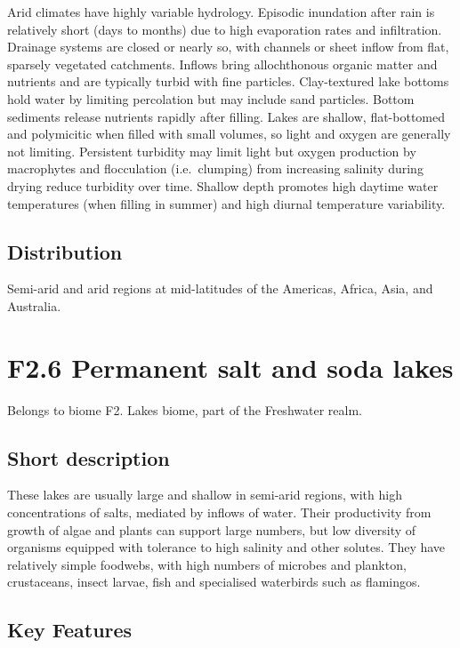 \documentclass[
  letterpaper,
  DIV=11,
  numbers=noendperiod]{scrartcl}
\begin{document}
Arid climates have highly variable hydrology. Episodic inundation after
rain is relatively short (days to months) due to high evaporation rates
and infiltration. Drainage systems are closed or nearly so, with
channels or sheet inflow from flat, sparsely vegetated catchments.
Inflows bring allochthonous organic matter and nutrients and are
typically turbid with fine particles. Clay-textured lake bottoms hold
water by limiting percolation but may include sand particles. Bottom
sediments release nutrients rapidly after filling. Lakes are shallow,
flat-bottomed and polymicitic when filled with small volumes, so light
and oxygen are generally not limiting. Persistent turbidity may limit
light but oxygen production by macrophytes and flocculation
(i.e.~clumping) from increasing salinity during drying reduce turbidity
over time. Shallow depth promotes high daytime water temperatures (when
filling in summer) and high diurnal temperature variability.

\subsection{Distribution}\label{distribution-12}

Semi-arid and arid regions at mid-latitudes of the Americas, Africa,
Asia, and Australia.

\section{F2.6 Permanent salt and soda
lakes}\label{f2.6-permanent-salt-and-soda-lakes}

Belongs to biome F2. Lakes biome, part of the Freshwater realm.

\subsection{Short description}\label{short-description-13}

These lakes are usually large and shallow in semi-arid regions, with
high concentrations of salts, mediated by inflows of water. Their
productivity from growth of algae and plants can support large numbers,
but low diversity of organisms equipped with tolerance to high salinity
and other solutes. They have relatively simple foodwebs, with high
numbers of microbes and plankton, crustaceans, insect larvae, fish and
specialised waterbirds such as flamingos.

\subsection{Key Features}\label{key-features-13}
\end{document}
